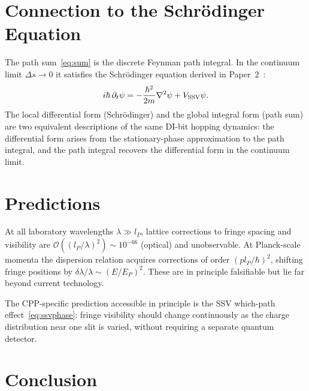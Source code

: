 \documentclass[11pt,a4paper]{article}
\newcommand{\lP}{l_P}
\newcommand{\EP}{E_P}
\begin{document}
\section{Connection to the Schr\"{o}dinger Equation}

The path sum~\eqref{eq:sum} is the discrete Feynman path integral.
In the continuum limit $\Delta s \to 0$ it satisfies the Schr\"{o}dinger
equation derived in Paper~2~\cite{cpp2040a}:
\begin{equation}
i\hbar\,\partial_t\psi = -\frac{\hbar^2}{2m}\nabla^2\psi + V_{\rm SSV}\psi.
\end{equation}
The local differential form (Schr\"{o}dinger) and the global integral
form (path sum) are two equivalent descriptions of the same DI-bit
hopping dynamics: the differential form arises from the stationary-phase
approximation to the path integral, and the path integral recovers
the differential form in the continuum limit.

\section{Predictions}

At all laboratory wavelengths $\lambda \gg \lP$, lattice corrections
to fringe spacing and visibility are $\mathcal{O}((\lP/\lambda)^2)
\sim 10^{-66}$ (optical) and unobservable.  At Planck-scale momenta
the dispersion relation acquires corrections of order $(p\lP/\hbar)^2$,
shifting fringe positions by $\delta\lambda/\lambda \sim (E/\EP)^2$.
These are in principle falsifiable but lie far beyond current
technology.

The CPP-specific prediction accessible in principle is the SSV
which-path effect~\eqref{eq:ssvphase}: fringe visibility should
change continuously as the charge distribution near one slit is varied,
without requiring a separate quantum detector.

\section{Conclusion}
\end{document}
